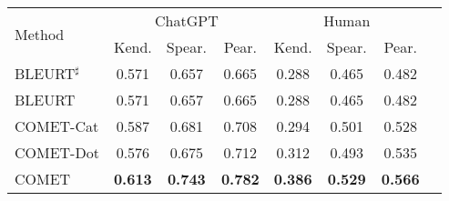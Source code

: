 \begin{tabular}{lccccccc}
\toprule[1.1pt]
    \multirow{2}{*}{Method}  & \multicolumn{3}{c}{ChatGPT}    & \multicolumn{3}{c}{Human}     \\ \cmidrule(l){2-4} \cmidrule(l){5-7} 
    &  Kend. & Spear.& Pear. & Kend. & Spear.& Pear. \\ \midrule
    BLEURT$^{\sharp}$     &0.571   &0.657   &0.665   &0.288  &0.465   &0.482   \\ 
    BLEURT     &0.571   &0.657   &0.665   &0.288  &0.465   &0.482   \\ 
    COMET-Cat  &0.587   &0.681   &0.708   &0.294  &0.501   &0.528   \\
    COMET-Dot  &0.576   &0.675   &0.712   &0.312  &0.493   &0.535   \\
    COMET  & \textbf{0.613}  & \textbf{0.743}& \textbf{0.782} & \textbf{0.386} & \textbf{0.529} & \textbf{0.566} \\ \bottomrule[1.1pt]
\end{tabular}